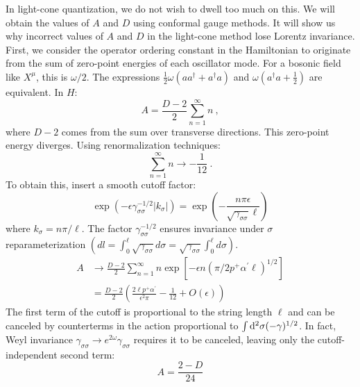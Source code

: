 In light-cone quantization, we do not wish to dwell too much on this. We will obtain the values of $A$ and $D$ using conformal gauge methods. It will show us why incorrect values of $A$ and $D$ in the light-cone method lose Lorentz invariance. 
First, we consider the operator ordering constant in the Hamiltonian to originate from the sum of zero-point energies of each oscillator mode. 
For a bosonic field like $X^\mu$, this is $\omega/2$. The expressions $\frac{1}{2} \omega\left(a a^{\dagger}+a^{\dagger} a\right)$ and $\omega\left(a^{\dagger} a+\frac{1}{2}\right)$ are equivalent. In $H$: 
\begin{equation}
	A=\frac{D-2}{2} \sum_{n=1}^{\infty} n \:, \label{1.3.31}
\end{equation}
where $D-2$ comes from the sum over transverse directions. This zero-point energy diverges. Using renormalization techniques: 
\begin{equation}
	\sum_{n=1}^{\infty} n \rightarrow-\frac{1}{12} \:.  \label{1.3.32}
\end{equation}
To obtain this, insert a smooth cutoff factor: 
\begin{equation}
	\exp (-\epsilon \gamma_{\sigma \sigma}^{-1 / 2}|k_{\sigma}|)=	\exp \left(-\frac{n\pi\epsilon}{\sqrt{\gamma_{\sigma\sigma}}\ell}\right) \label{1.3.33}
\end{equation}
where $k_\sigma=n\pi/\ell$. The factor $\gamma_{\sigma\sigma}^{-1/2}$ ensures invariance under $\sigma$ reparameterization $(dl=\int_{0}^{\ell} \sqrt{\gamma_{\sigma\sigma}}d\sigma=\sqrt{\gamma_{\sigma\sigma}}\int_0^{\ell}d\sigma)$. 
\begin{equation}
	\begin{aligned}
		A & \rightarrow \frac{D-2}{2} \sum_{n=1}^{\infty} n \exp \left[-\epsilon n\left(\pi / 2 p^{+} \alpha^{\prime} \ell\right)^{1 / 2}\right]\\
		&=\frac{D-2}{2}\left(\frac{2 \ell p^{+} \alpha^{\prime}}{\epsilon^{2} \pi}-\frac{1}{12}+O(\epsilon)\right)
	\end{aligned}
\end{equation}
The first term of the cutoff is proportional to the string length $\ell$ and can be canceled by counterterms in the action proportional to $\int \mathrm{d}^2\sigma(-\gamma)^{1/2}$. 
In fact, Weyl invariance $\gamma_{\sigma\sigma}\to e^{2\omega}\gamma_{\sigma\sigma}$ requires it to be canceled, leaving only the cutoff-independent second term: 
\begin{equation}
	A=\frac{2-D}{24}
\end{equation}
